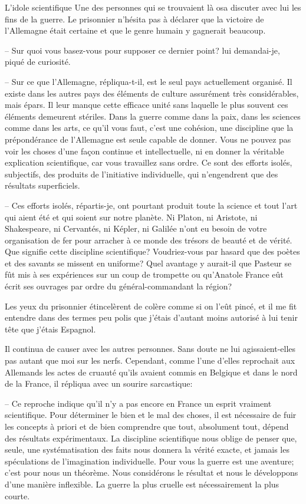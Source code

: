 \begin{chapter}{L'idole scientifique}
Une des personnes qui se trouvaient là osa discuter avec lui les fins de
la guerre. Le prisonnier n'hésita pas à déclarer que la victoire de
l'Allemagne était certaine et que le genre humain y gagnerait beaucoup.

-- Sur quoi vous basez-vous pour supposer ce dernier point? lui
demandai-je, piqué de curiosité.

-- Sur ce que l'Allemagne, répliqua-t-il, est le seul pays actuellement
organisé. Il existe dans les autres pays des éléments de culture
assurément très considérables, mais épars. Il leur manque cette efficace
unité sans laquelle le plus souvent ces éléments demeurent stériles.
Dans la guerre comme dans la paix, dans les sciences comme dans les
arts, ce qu'il vous faut, c'est une cohésion, une discipline que la
prépondérance de l'Allemagne est seule capable de donner. Vous ne
pouvez pas voir les choses d'une façon continue et intellectuelle, ni en
donner la véritable explication scientifique, car vous travaillez sans
ordre. Ce sont des efforts isolés, subjectifs, des produits de
l'initiative individuelle, qui n'engendrent que des résultats
superficiels.

-- Ces efforts isolés, répartis-je, ont pourtant produit toute la science
et tout l'art qui aient été et qui soient sur notre planète. Ni Platon,
ni Aristote, ni Shakespeare, ni Cervantés, ni Képler, ni Galilée n'ont
eu besoin de votre organisation de fer pour arracher à ce monde des
trésors de beauté et de vérité. Que signifie cette discipline
scientifique? Voudriez-vous par hasard que des poètes et des savants se
missent en uniforme? Quel avantage y aurait-il que Pasteur se fût mis à
ses expériences sur un coup de trompette ou qu'Anatole France eût écrit
ses ouvrages par ordre du général-commandant la région?

Les yeux du prisonnier étincelèrent de colère comme si on l'eût pincé,
et il me fit entendre dans des termes peu polis que j'étais d'autant
moins autorisé à lui tenir tête que j'étais Espagnol.

Il continua de causer avec les autres personnes. Sans doute ne lui
agissaient-elles pas autant que moi sur les nerfs. Cependant, comme
l'une d'elles reprochait aux Allemands les actes de cruauté qu'ils
avaient commis en Belgique et dans le nord de la France, il répliqua
avec un sourire sarcastique:

-- Ce reproche indique qu'il n'y a pas encore en France un esprit
vraiment scientifique. Pour déterminer le bien et le mal des choses, il
est nécessaire de fuir les concepts à priori et de bien comprendre que
tout, absolument tout, dépend des résultats expérimentaux. La discipline
scientifique nous oblige de penser que, seule, une systématisation des
faits nous donnera la vérité exacte, et jamais les spéculations de
l'imagination individuelle. Pour vous la guerre est une aventure; c'est
pour nous un théorème. Nous considérons le résultat et nous le
développons d'une manière inflexible. La guerre la plus cruelle est
nécessairement la plus courte.


\end{chapter}
